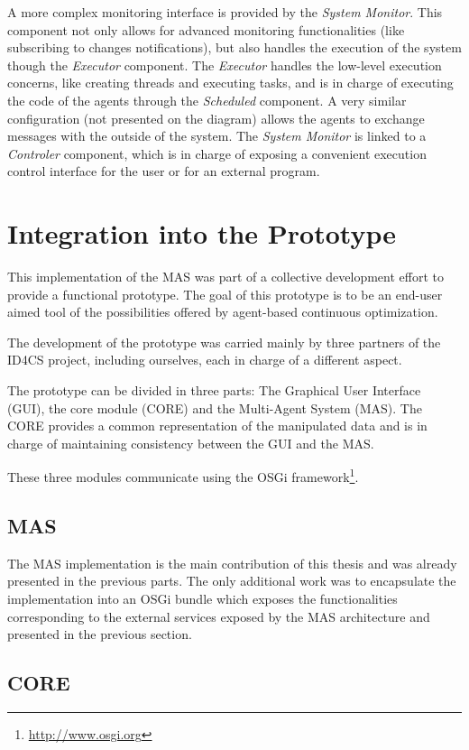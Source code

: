 A more complex monitoring interface is provided by the \emph{System Monitor}. This component not only allows for advanced monitoring functionalities (like subscribing to changes notifications), but also handles the execution of the system though the \emph{Executor} component. The \emph{Executor} handles the low-level execution concerns, like creating threads and executing tasks, and is in charge of executing the code of the agents through the \emph{Scheduled} component. A very similar configuration (not presented on the diagram) allows the agents to exchange messages with the outside of the system. The \emph{System Monitor} is linked to a \emph{Controler} component, which is in charge of exposing a convenient execution control interface for the user or for an external program.

\section{Integration into the Prototype}

This implementation of the MAS was part of a collective development effort to provide a functional prototype. The goal of this prototype is to be an end-user aimed tool of the possibilities offered by agent-based continuous optimization.

The development of the prototype was carried mainly by three partners of the ID4CS project, including ourselves, each in charge of a different aspect.

The prototype can be divided in three parts: The Graphical User Interface (GUI), the core module (CORE) and the Multi-Agent System (MAS). The CORE provides a common representation of the manipulated data and is in charge of maintaining consistency between the GUI and the MAS.

These three modules communicate using the OSGi framework\footnote{\url{http://www.osgi.org}}.

\subsection{MAS}

The MAS implementation is the main contribution of this thesis and was already presented in the previous parts. The only additional work was to encapsulate the implementation into an OSGi bundle which exposes the functionalities corresponding to the external services exposed by the MAS architecture and presented in the previous section.

\subsection{CORE}

